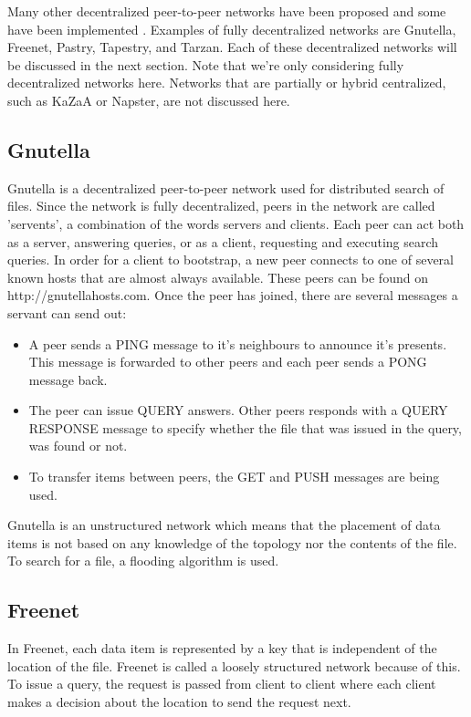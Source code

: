 \documentclass{article}
\begin{document}
	Many other decentralized peer-to-peer networks have been proposed and some have been implemented \cite{mislove2004ap3, rennhard2002introducing, panchenko2006nisan, rowstron2001pastry, nambiar2006salsa, freedman2002tarzan, ripeanu2001peer, androutsellis2004survey}. Examples of fully decentralized networks are Gnutella, Freenet, Pastry, Tapestry, and Tarzan. Each of these decentralized networks will be discussed in the next section. Note that we're only considering fully decentralized networks here. Networks that are partially or hybrid centralized, such as KaZaA or Napster, are not discussed here.

	\subsection{Gnutella} %
		Gnutella is a decentralized peer-to-peer network used for distributed search of files. Since the network is fully decentralized, peers in the network are called 'servents', a combination of the words servers and clients. Each peer can act both as a server, answering queries, or as a client, requesting and executing search queries. In order for a client to bootstrap, a new peer connects to one of several known hosts that are almost always available. These peers can be found on http://gnutellahosts.com. Once the peer has joined, there are several messages a servant can send out:
	
		\begin{itemize}
			\item A peer sends a PING message to it's neighbours to announce it's presents. This message is forwarded to other peers and each peer sends a PONG message back.
			\item The peer can issue QUERY answers. Other peers responds with a QUERY RESPONSE message to specify whether the file that was issued in the query, was found or not.
			\item To transfer items between peers, the GET and PUSH messages are being used.
		\end{itemize}
		
		Gnutella is an unstructured network which means that the placement of data items is not based on any knowledge of the topology nor the contents of the file. To search for a file, a flooding algorithm is used.
	
	\subsection{Freenet} %
		In Freenet, each data item is represented by a key that is independent of the location of the file. Freenet is called a loosely structured network because of this. To issue a query, the request is passed from client to client where each client makes a decision about the location to send the request next.
		
\end{document}
